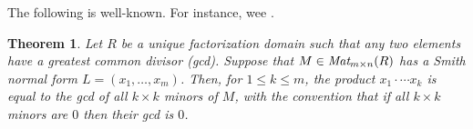 \documentclass[11pt,reqno]{amsart}
\DeclareMathOperator{\Pic}{Pic}
\DeclareMathOperator{\Jac}{Jac}
\DeclareMathOperator{\Div}{Div}
\DeclareMathOperator{\Deg}{deg}
\theoremstyle{definition}
\theoremstyle{plain}
\newtheorem{mytheorem}[mydef]{Theorem}
\begin{document}
The following is well-known. For instance, wee \cite[Theorem 2.4]{stanley2016smith}.

\begin{mytheorem}\label{theorem: gcd theorem}
Let $R$ be a unique factorization domain such that any two elements have a greatest common divisor (gcd). Suppose that $M \in \emph{Mat}_{m \times n}(R)$ has a Smith normal form $L=(x_1,\dots,x_m)$. Then, for $1\leq k \leq m$, the product $x_1\cdot \cdots x_k$ is equal to the gcd of all $k\times k$ minors of $M$, with the convention that if all $k\times k$ minors are $0$ then their gcd is $0$. 
\end{mytheorem}



\end{document}
